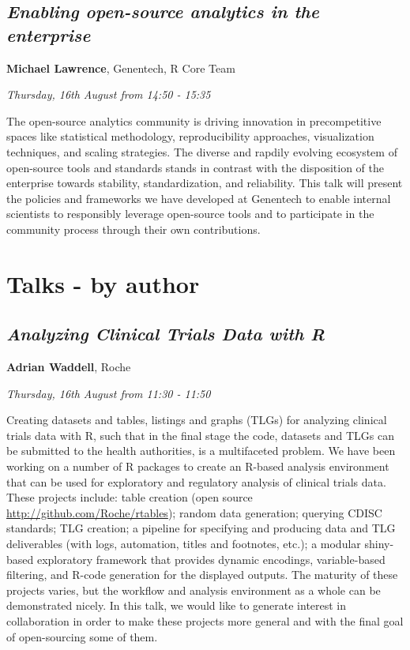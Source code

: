 \documentclass[]{book}
\theoremstyle{definition}
\theoremstyle{definition}
\theoremstyle{definition}
\theoremstyle{remark}
\begin{document}
\hypertarget{enabling-open-source-analytics-in-the-enterprise}{%
\section{\texorpdfstring{\emph{Enabling open-source analytics in the
enterprise}}{Enabling open-source analytics in the enterprise}}\label{enabling-open-source-analytics-in-the-enterprise}}

\textbf{Michael Lawrence}, Genentech, R Core Team

\emph{Thursday, 16th August from 14:50 - 15:35}

The open-source analytics community is driving innovation in
precompetitive spaces like statistical methodology, reproducibility
approaches, visualization techniques, and scaling strategies. The
diverse and rapdily evolving ecosystem of open-source tools and
standards stands in contrast with the disposition of the enterprise
towards stability, standardization, and reliability. This talk will
present the policies and frameworks we have developed at Genentech to
enable internal scientists to responsibly leverage open-source tools and
to participate in the community process through their own contributions.

\hypertarget{talks---by-author}{%
\chapter{Talks - by author}\label{talks---by-author}}

\hypertarget{analyzing-clinical-trials-data-with-r}{%
\section{\texorpdfstring{\emph{Analyzing Clinical Trials Data with
R}}{Analyzing Clinical Trials Data with R}}\label{analyzing-clinical-trials-data-with-r}}

\textbf{Adrian Waddell}, Roche

\emph{Thursday, 16th August from 11:30 - 11:50}

Creating datasets and tables, listings and graphs (TLGs) for analyzing
clinical trials data with R, such that in the final stage the code,
datasets and TLGs can be submitted to the health authorities, is a
multifaceted problem. We have been working on a number of R packages to
create an R-based analysis environment that can be used for exploratory
and regulatory analysis of clinical trials data. These projects include:
table creation (open source \url{http://github.com/Roche/rtables});
random data generation; querying CDISC standards; TLG creation; a
pipeline for specifying and producing data and TLG deliverables (with
logs, automation, titles and footnotes, etc.); a modular shiny-based
exploratory framework that provides dynamic encodings, variable-based
filtering, and R-code generation for the displayed outputs. The maturity
of these projects varies, but the workflow and analysis environment as a
whole can be demonstrated nicely. In this talk, we would like to
generate interest in collaboration in order to make these projects more
general and with the final goal of open-sourcing some of them.
\end{document}
